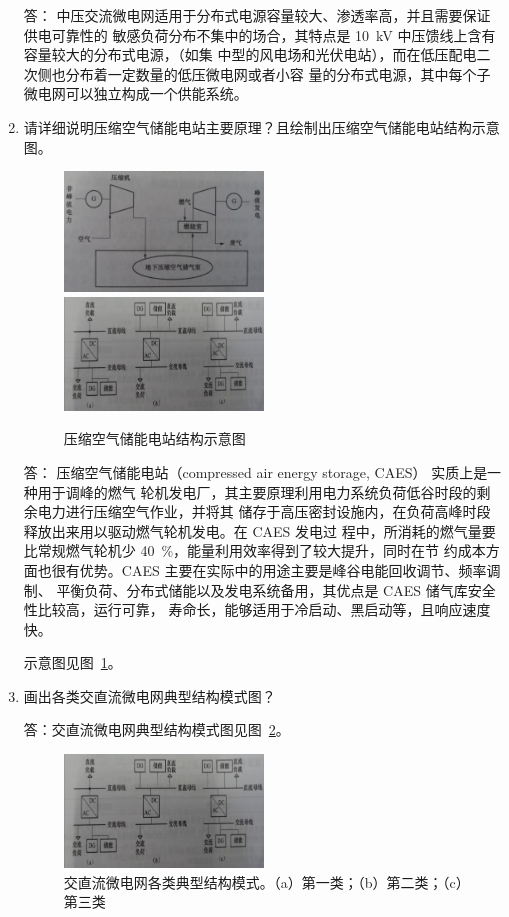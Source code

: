 \documentclass[zihao=-4]{ctexart}
\let\SIold\SI
\renewcommand{\SI}[2]{\mbox{\SIold{#1}{#2}}}
\begin{document}
\begin{enumerate}
\noindent 答： 中压交流微电网适用于分布式电源容量较大、渗透率高，并且需要保证供电可靠性的
敏感负荷分布不集中的场合，其特点是 \SI{10}{kV} 中压馈线上含有容量较大的分布式电源，（如集
中型的风电场和光伏电站），而在低压配电二次侧也分布着一定数量的低压微电网或者小容
量的分布式电源，其中每个子微电网可以独立构成一个供能系统。
\item 请详细说明压缩空气储能电站主要原理？且绘制出压缩空气储能电站结构示意图。
\begin{figure}[!htbp]
  \centering
  \includegraphics[width=0.5\textwidth]{fig2.png}%
  \includegraphics[width=0.5\textwidth]{fig3.png}
  \caption{压缩空气储能电站结构示意图}\label{fig:2}
\end{figure}

\noindent 答：
压缩空气储能电站（compressed air energy storage, CAES） 实质上是一种用于调峰的燃气
轮机发电厂，其主要原理利用电力系统负荷低谷时段的剩余电力进行压缩空气作业，并将其
储存于高压密封设施内，在负荷高峰时段释放出来用以驱动燃气轮机发电。在 CAES 发电过
程中，所消耗的燃气量要比常规燃气轮机少 \SI{40}{\percent}，能量利用效率得到了较大提升，同时在节
约成本方面也很有优势。CAES 主要在实际中的用途主要是峰谷电能回收调节、频率调制、
平衡负荷、分布式储能以及发电系统备用，其优点是 CAES 储气库安全性比较高，运行可靠，
寿命长，能够适用于冷启动、黑启动等，且响应速度快。

示意图见图~\ref{fig:2}。

\item 画出各类交直流微电网典型结构模式图？

\noindent 答：交直流微电网典型结构模式图见图~\ref{fig:3}。

\begin{figure}[!htbp]
  \centering
  \includegraphics[width=0.5\textwidth]{fig3.png}
  \caption{交直流微电网各类典型结构模式。（a）第一类；（b）第二类；（c）第三类}\label{fig:3}
\end{figure}


\end{enumerate}
\end{document}
